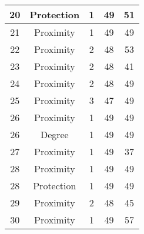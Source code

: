 \documentclass[results.tex]{subfiles}
\begin{document}
\begin{center}
\begin{tabular}{| c || c | c | c | c |}
            \hline
            20                      & Protection                   & 1                      & 49                      & 51                   \\
            \hline
            21                      & Proximity                    & 1                      & 49                      & 49                   \\
            \hline
            22                      & Proximity                    & 2                      & 48                      & 53                   \\
            \hline
            23                      & Proximity                    & 2                      & 48                      & 41                   \\
            \hline
            24                      & Proximity                    & 2                      & 48                      & 49                   \\
            \hline
            25                      & Proximity                    & 3                      & 47                      & 49                   \\
            \hline
            26                      & Proximity                    & 1                      & 49                      & 49                   \\
            \hline
            26                      & Degree                       & 1                      & 49                      & 49                   \\
            \hline
            27                      & Proximity                    & 1                      & 49                      & 37                   \\
            \hline
            28                      & Proximity                    & 1                      & 49                      & 49                   \\
            \hline
            28                      & Protection                   & 1                      & 49                      & 49                   \\
            \hline
            29                      & Proximity                    & 2                      & 48                      & 45                   \\
            \hline
            30                      & Proximity                    & 1                      & 49                      & 57                   \\

\end{tabular}
\end{center}
\end{document}
